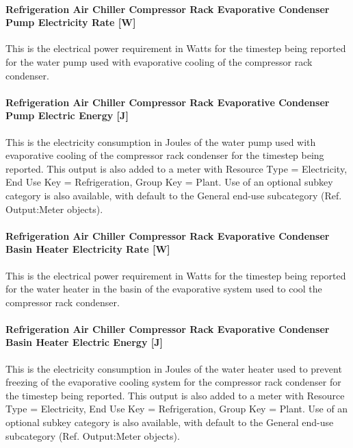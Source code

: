 \paragraph{Refrigeration Air Chiller Compressor Rack Evaporative Condenser Pump Electricity Rate {[}W{]}}\label{refrigeration-air-chiller-compressor-rack-evaporative-condenser-pump-electric-power-w}

This is the electrical power requirement in Watts for the timestep being reported for the water pump used with evaporative cooling of the compressor rack condenser.

\paragraph{Refrigeration Air Chiller Compressor Rack Evaporative Condenser Pump Electric Energy {[}J{]}}\label{refrigeration-air-chiller-compressor-rack-evaporative-condenser-pump-electric-energy-j}

This is the electricity consumption in Joules of the water pump used with evaporative cooling of the compressor rack condenser for the timestep being reported. This output is also added to a meter with Resource Type = Electricity, End Use Key = Refrigeration, Group Key = Plant. Use of an optional subkey category is also available, with default to the General end-use subcategory (Ref. Output:Meter objects).

\paragraph{Refrigeration Air Chiller Compressor Rack Evaporative Condenser Basin Heater Electricity Rate {[}W{]}}\label{refrigeration-air-chiller-compressor-rack-evaporative-condenser-basin-heater-electric-power-w}

This is the electrical power requirement in Watts for the timestep being reported for the water heater in the basin of the evaporative system used to cool the compressor rack condenser.

\paragraph{Refrigeration Air Chiller Compressor Rack Evaporative Condenser Basin Heater Electric Energy {[}J{]}}\label{refrigeration-air-chiller-compressor-rack-evaporative-condenser-basin-heater-electric-energy-j}

This is the electricity consumption in Joules of the water heater used to prevent freezing of the evaporative cooling system for the compressor rack condenser for the timestep being reported. This output is also added to a meter with Resource Type = Electricity, End Use Key = Refrigeration, Group Key = Plant. Use of an optional subkey category is also available, with default to the General end-use subcategory (Ref. Output:Meter objects).

